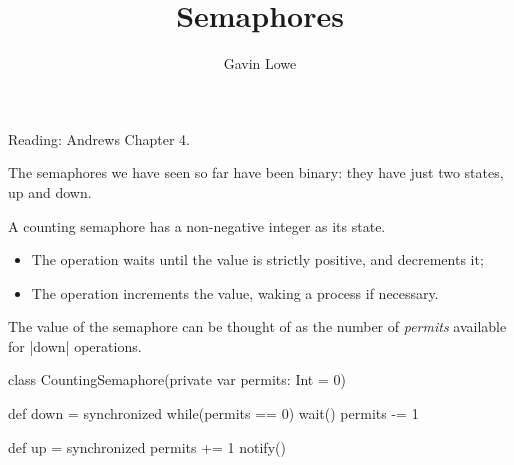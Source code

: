 \documentclass[notes,color]{sepslide0}
\title{Semaphores}
\author{Gavin Lowe}
\begin{document}
\begin{slide}
  
  \Title

Reading: Andrews Chapter 4.
\end{slide}


% 





\begin{slide}

The semaphores we have seen so far have been binary: they have just two
states, up and down.

A counting semaphore has a non-negative integer as its state.
%
\begin{itemize}
\item
The  operation waits until the value is strictly positive, and
decrements it;

\item
The  operation increments the value, waking a process if necessary.
\end{itemize}
%
The value of the semaphore can be thought of as the number of \emph{permits}
available for |down| operations. 
\end{slide}


\begin{slide}

\begin{scala}
class CountingSemaphore(private var permits: Int = 0){

  def down = synchronized{
    while(permits == 0) wait()
    permits -= 1
  }

  def up = synchronized{
    permits += 1
    notify()
  }
}
\end{scala}
\end{slide}

\end{document}

